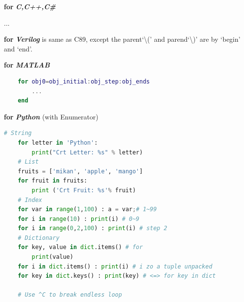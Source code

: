 \textbf{for }\textbf{\textit{C,C++,C\#}}



...



\textbf{for }\textbf{\textit{Verilog}} is same as C89, except the parent`\textbackslash{}(' and parend`\textbackslash{})' are by `begin' and `end'.



\textbf{for }\textbf{\textit{MATLAB}}

\begin{lstlisting}[language=MATLAB]
	% obj_initial~obj_ends. step can be omitted and default one
	for obj0=obj_initial:obj_step:obj_ends
		...
	end
\end{lstlisting}



\textbf{for }\textbf{\textit{Python}} (with Enumerator)

\begin{lstlisting}[language=Python]
	# String
	for letter in 'Python':
		print("Crt Letter: %s" % letter)
	# List
	fruits = ['mikan', 'apple', 'mango']
	for fruit in fruits:
		print ('Crt Fruit: %s'% fruit)
	# Index
	for var in range(1,100) : a = var;# 1~99
	for i in range(10) : print(i) # 0~9
	for i in range(0,2,100) : print(i) # step 2
	# Dictionary
	for key, value in dict.items() # for 
		print(value)
	for i in dict.items() : print(i) # i zo a tuple unpacked
	for key in dict.keys() : print(key) # <=> for key in dict
	
	# Use ^C to break endless loop
\end{lstlisting}

